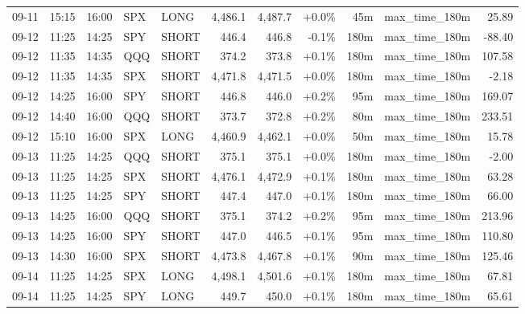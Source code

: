 \documentclass[11pt,a4paper,twoside]{article}
\begin{document}
\begin{center}
\begin{longtable}{>{\color{txtmain}}l l l l l r r r r >{\color{txtmain}}l r}
09-11 & 15:15 & 16:00 & SPX & LONG & 4,486.1 & 4,487.7 & \textcolor{wingreen}{+0.0\%} & 45m & max\_time\_180m & \textcolor{wingreen}{25.89} \\
09-12 & 11:25 & 14:25 & SPY & SHORT & 446.4 & 446.8 & \textcolor{lossred}{-0.1\%} & 180m & max\_time\_180m & \textcolor{lossred}{-88.40} \\
09-12 & 11:35 & 14:35 & QQQ & SHORT & 374.2 & 373.8 & \textcolor{wingreen}{+0.1\%} & 180m & max\_time\_180m & \textcolor{wingreen}{107.58} \\
09-12 & 11:35 & 14:35 & SPX & SHORT & 4,471.8 & 4,471.5 & \textcolor{wingreen}{+0.0\%} & 180m & max\_time\_180m & \textcolor{lossred}{-2.18} \\
09-12 & 14:25 & 16:00 & SPY & SHORT & 446.8 & 446.0 & \textcolor{wingreen}{+0.2\%} & 95m & max\_time\_180m & \textcolor{wingreen}{169.07} \\
09-12 & 14:40 & 16:00 & QQQ & SHORT & 373.7 & 372.8 & \textcolor{wingreen}{+0.2\%} & 80m & max\_time\_180m & \textcolor{wingreen}{233.51} \\
09-12 & 15:10 & 16:00 & SPX & LONG & 4,460.9 & 4,462.1 & \textcolor{wingreen}{+0.0\%} & 50m & max\_time\_180m & \textcolor{wingreen}{15.78} \\
09-13 & 11:25 & 14:25 & QQQ & SHORT & 375.1 & 375.1 & \textcolor{wingreen}{+0.0\%} & 180m & max\_time\_180m & \textcolor{lossred}{-2.00} \\
09-13 & 11:25 & 14:25 & SPX & SHORT & 4,476.1 & 4,472.9 & \textcolor{wingreen}{+0.1\%} & 180m & max\_time\_180m & \textcolor{wingreen}{63.28} \\
09-13 & 11:25 & 14:25 & SPY & SHORT & 447.4 & 447.0 & \textcolor{wingreen}{+0.1\%} & 180m & max\_time\_180m & \textcolor{wingreen}{66.00} \\
09-13 & 14:25 & 16:00 & QQQ & SHORT & 375.1 & 374.2 & \textcolor{wingreen}{+0.2\%} & 95m & max\_time\_180m & \textcolor{wingreen}{213.96} \\
09-13 & 14:25 & 16:00 & SPY & SHORT & 447.0 & 446.5 & \textcolor{wingreen}{+0.1\%} & 95m & max\_time\_180m & \textcolor{wingreen}{110.80} \\
09-13 & 14:30 & 16:00 & SPX & SHORT & 4,473.8 & 4,467.8 & \textcolor{wingreen}{+0.1\%} & 90m & max\_time\_180m & \textcolor{wingreen}{125.46} \\
09-14 & 11:25 & 14:25 & SPX & LONG & 4,498.1 & 4,501.6 & \textcolor{wingreen}{+0.1\%} & 180m & max\_time\_180m & \textcolor{wingreen}{67.81} \\
09-14 & 11:25 & 14:25 & SPY & LONG & 449.7 & 450.0 & \textcolor{wingreen}{+0.1\%} & 180m & max\_time\_180m & \textcolor{wingreen}{65.61} \\

\end{longtable}
\end{center}
\end{document}
